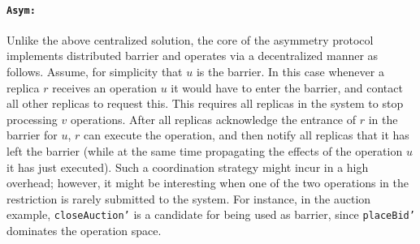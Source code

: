 \paragraph{{\tt Asym:}} Unlike the above centralized solution, the core of the asymmetry protocol
implements distributed barrier and operates via a decentralized manner as follows. Assume, for
simplicity that $u$ is the barrier. In this case whenever
a replica $r$ receives an operation $u$ it would have to enter the barrier,
and contact all other replicas to request this. This requires all
replicas in the system to stop processing $v$ operations.
After all replicas acknowledge the entrance of $r$ in the barrier for $u$, $r$ can execute the operation, and then notify all replicas 
that it has left the barrier (while at the same time propagating the effects
of the operation $u$ it has just executed).
Such a coordination strategy might incur
in a high overhead; however, it might be interesting when one of
the two operations in the restriction is rarely submitted to the system.
For instance, in the auction example, {\tt closeAuction'} is
a candidate for being used as barrier, since 
{\tt placeBid'} dominates the operation space.


